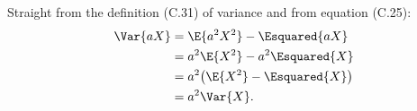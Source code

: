 Straight from the definition (C.31) of variance and from equation (C.25):
\begin{align*}
    \Var{aX} &= \E{a^2X^2}-\Esquared{aX} \\
    &= a^2\E{X^2}-a^2\Esquared{X} \\
    &= a^2\!\left(\E{X^2}-\Esquared{X}\right) \\
    &= a^2\Var{X}.
\end{align*}
